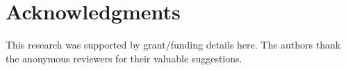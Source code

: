 \section*{Acknowledgments}
This research was supported by grant/funding details here. The authors thank the anonymous reviewers for their valuable suggestions.
